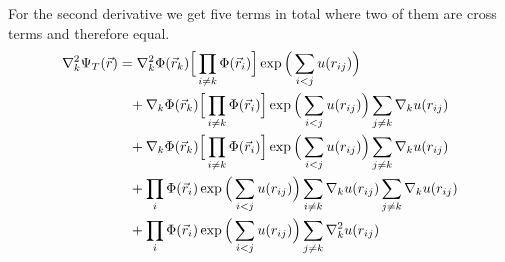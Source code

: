 \documentclass[norsk,a4paper,12pt]{article}
\begin{document}
For the second derivative we get five terms in total where two of them are cross terms and therefore equal. 
\begin{align}
\nabla_k^2\Psi_T(\vec{r})&=\nabla_k^2\Phi(\vec{r}_k)\Big[\prod_{i \neq k}\Phi(\vec{r}_i)\Big]\exp\Big(\sum_{i<j}u(r_{ij})\Big)\notag\\
&\phantom{=}+\nabla_k\Phi(\vec{r}_k)\Big[\prod_{i \neq k}\Phi(\vec{r}_i)\Big]\exp\Big(\sum_{i<j}u(r_{ij})\Big)\sum_{j\neq k}\nabla_ku(r_{ij})\notag\\
&\phantom{=}+\nabla_k\Phi(\vec{r}_k)\Big[\prod_{i \neq k}\Phi(\vec{r}_i)\Big]\exp\Big(\sum_{i<j}u(r_{ij})\Big)\sum_{j\neq k}\nabla_ku(r_{ij})\\
&\phantom{=}+\prod_i\Phi(\vec{r}_i)\exp\Big(\sum_{i<j}u(r_{ij})\Big)\sum_{i\neq k}\nabla_ku(r_{ij})\sum_{j\neq k}\nabla_ku(r_{ij})\notag\\
&\phantom{=}+\prod_i\Phi(\vec{r}_i)\exp\Big(\sum_{i<j}u(r_{ij})\Big)\sum_{j\neq k}\nabla_k^2u(r_{ij})\notag
\end{align}
\end{document}
